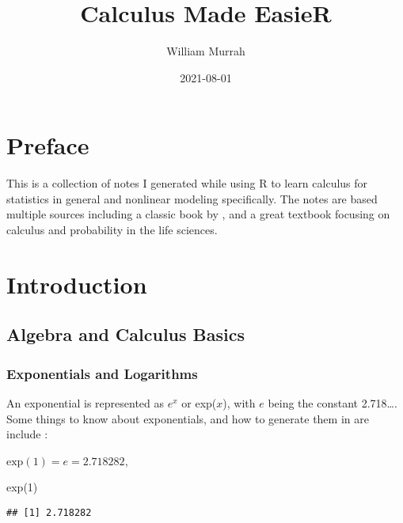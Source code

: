 \documentclass[
]{book}
\title{Calculus Made EasieR}
\author{William Murrah}
\date{2021-08-01}
\newenvironment{Shaded}{\begin{snugshade}}{\end{snugshade}}
\newcommand{\DecValTok}[1]{\textcolor[rgb]{0.00,0.00,0.81}{#1}}
\newcommand{\FunctionTok}[1]{\textcolor[rgb]{0.00,0.00,0.00}{#1}}
\newcommand{\NormalTok}[1]{#1}
\begin{document}
\maketitle

{
\setcounter{tocdepth}{1}
\tableofcontents
}
\hypertarget{preface}{%
\chapter*{Preface}\label{preface}}

This is a collection of notes I generated while using R to learn calculus for statistics in general and nonlinear modeling specifically.
The notes are based multiple sources including a classic book by \citet{thompson1998calculus}, and a great textbook focusing on calculus and probability in the life sciences\citep{adler2012modeling}.

\hypertarget{intro}{%
\chapter{Introduction}\label{intro}}

\hypertarget{algebra-and-calculus-basics}{%
\section{Algebra and Calculus Basics}\label{algebra-and-calculus-basics}}

\hypertarget{exponentials-and-logarithms}{%
\subsection{Exponentials and Logarithms}\label{exponentials-and-logarithms}}

An exponential is represented as \(e^x\) or exp(\(x\)), with \(e\) being the constant 2.718\ldots.
Some things to know about exponentials, and how to generate them in are include \citep{bolker2008ecological}:

\(\text{exp}(1) = e = 2.718282\),

\begin{Shaded}
\begin{Highlighting}[]
\FunctionTok{exp}\NormalTok{(}\DecValTok{1}\NormalTok{)}
\end{Highlighting}
\end{Shaded}

\begin{verbatim}
## [1] 2.718282
\end{verbatim}
\end{document}
